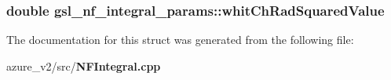 \subsubsection{\setlength{\rightskip}{0pt plus 5cm}double \bf{gsl\_\-nf\_\-integral\_\-params::whit\-Ch\-Rad\-Squared\-Value}}\label{structgsl__nf__integral__params_9a078edc462b742246e3e4b8ca4cfb40}




The documentation for this struct was generated from the following file:\begin{CompactItemize}
\item 
azure\_\-v2/src/\bf{NFIntegral.cpp}\end{CompactItemize}
